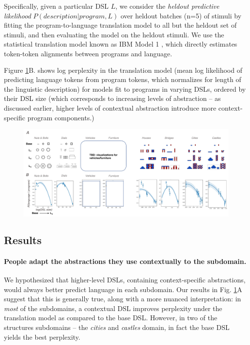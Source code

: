 \documentclass[10pt,letterpaper]{article}
\begin{document}
Specifically, given a particular DSL $L$, we consider the \textit{heldout predictive likelihood} $P(description | program, L)$ over heldout batches (n=5) of stimuli  by fitting the program-to-language translation model to all but the heldout set of stimuli, and then evaluating the model on the heldout stimuli. We use the statistical translation model known as IBM Model 1 \cite{gal2013systematic}, which directly estimates token-token alignments between programs and language.

Figure \ref{fig:language_libraries}B. shows log perplexity in the translation model (mean log likelihood of predicting language tokens from program tokens, which normalizes for length of the linguistic description) for models fit to programs in varying DSLs, ordered by their DSL size (which corresponds to increasing levels of abstraction -- as discussed earlier, higher levels of contextual abstraction introduce more context-specific program components.)

\begin{figure}[h]
  \begin{center}
  \includegraphics[width=0.99\linewidth]{figures/fig_language_libraries.pdf}
  \captionenerating 
  \label{fig:language_libraries}
  \end{center}
  \end{figure}
 
\subsection{Results}

\paragraph{People adapt the abstractions they use contextually to the subdomain.} We hypothesized that higher-level DSLs, containing context-specific abstractions, would always better predict language in each subdomain. Our results in Fig.  \ref{fig:language_libraries}A suggest that this is generally true, along with a more nuanced interpretation: in \textit{most} of the subdomains, a contextual DSL improves perplexity under the translation model as compared to the base DSL. However, in two of the structures subdomains --  the \textit{cities} and \textit{castles} domain, in fact the base DSL yields the best perplexity. 
\end{document}
